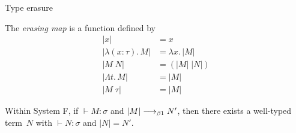 %
%
%  


\begin{frame}{Type erasure}
\begin{definition}
  The \emph{erasing map} is a function defined by
  \begin{align*}
    |x| & = x \\
    |\lambda (x : \tau).\,M| & = \lambda x.\, |M| \\
    |M\;N| & = (|M|\;|N|) \\
    |\Lambda t.\, M| & = |M| \\
    |M\;\tau| & = |M|
  \end{align*}
\end{definition}

\begin{proposition}
  Within System F, if ${}\vdash M : \sigma$ and $|M|
  \longrightarrow_{\beta1} N'$, then there exists a well-typed term~$N$ with
  ${}\vdash N : \sigma$ and $|N| = N'$.
\end{proposition}
\end{frame}

